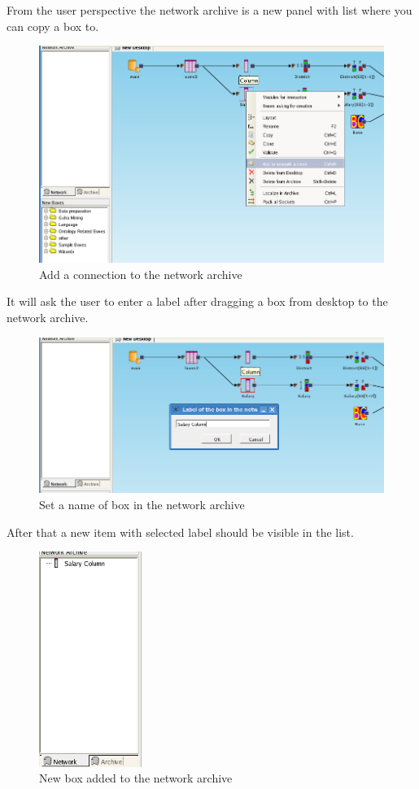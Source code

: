 \documentclass[a4paper,12pt]{book}
\begin{document}
From the user perspective the network archive is a new panel with list where you can copy a box to.
\begin{figure}
	\includegraphics[width=1\textwidth]{add_to_network_archive}
	\caption{Add a connection to the network archive}
\end{figure}
It will ask the user to enter a label after dragging a box from desktop to the network archive.
\begin{figure}
	\includegraphics[width=1\textwidth]{set_name_of_box_in_network_archive}
	\caption{Set a name of box in the network archive}
\end{figure}
After that a new item with selected label should be visible in the list.
\begin{figure}
	\includegraphics[height=7cm]{network_archive_box_added}
	\caption{New box added to the network archive}
\end{figure}
\end{document}
